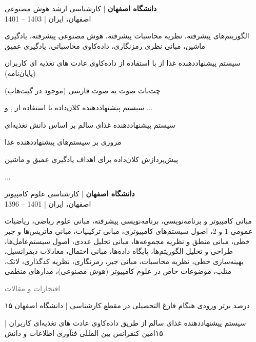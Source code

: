 \documentclass[a4paper]{deedy-persian} %
\begin{document}
\begin{minipage}[t]{0.62\textwidth}
\textbf{دانشگاه اصفهان} | کارشناسی ارشد هوش مصنوعی  \\
\vspace{\itemsep} 
1401 – 1403 | اصفهان، ایران
\vspace{\itemsep} 
\begin{tightitemize}
\item الگوریتم‌های پیشرفته، نظریه محاسبات پیشرفته، هوش مصنوعی پیشرفته، یادگیری ماشین، مبانی نظری رمزنگاری، داده‌کاوی محاسباتی، یادگیری عمیق
\item سیستم پیشنهاددهنده غذا از با استفاده از داده‌کاوی عادت های تغذیه ای کاربران (پایان‌نامه)
\item چت‌بات صوت به صوت فارسی (موجود در گیت‌هاب)
\item سیستم پیشنهاددهنده کلان‌داده با استفاده از ,  و ...
\item سیستم پیشنهاد‌دهنده غذای سالم بر اساس دانش تغذیه‌ای
\item مروری بر سیستم‌های پیشنهاددهنده غذا
\item پیش‌پردازش کلان‌داده برای اهداف یادگیری عمیق و ماشین
\item ...
\end{tightitemize}
\sectionspace %
\textbf{دانشگاه اصفهان} | کارشناسی علوم کامپیوتر  \\
\vspace{\itemsep} %
1396 – 1401 | اصفهان، ایران
\begin{tightitemize}
\item مبانی کامپیوتر و برنامه‌نویسی، برنامه‌نویسی پیشرفته، مبانی علوم ریاضی، ریاضیات عمومی 1 و 2، اصول سیستم‌های کامپیوتری، مبانی ترکیبیات، مبانی ماتریس‌ها و جبر خطی، مبانی منطق و نظریه مجموعه‌ها، مبانی تحلیل عددی، اصول سیستم‌عامل‌ها، طراحی و تحلیل الگوریتم‌ها، پایگاه داده‌ها، مبانی احتمال، معادلات دیفرانسیل، بهینه‌سازی خطی، نظریه محاسبات، مبانی جبر، رمزنگاری، نظریه کدگذاری، لاتک، متلب، موضوعات خاص در علوم کامپیوتر (هوش مصنوعی)، مدارهای منطقی
\end{tightitemize}
\sectionspace %
\vspace{\topsep}
\textcolor{gray}{\huge {افتخارات و مقالات}}
\vspace{\itemsep} %
\begin{tightitemize}
\item ۱۵ درصد برتر ورودی هنگام فارغ التحصیلی در مقطع کارشناسی | دانشگاه اصفهان
\item سیستم پیشنهاددهنده غذای سالم از طریق داده‌کاوی عادت های تغذیه‌ای کاربران | ۱۵‌امین کنفرانس بین المللی فنآوری اطلاعات و دانش 

\end{tightitemize}
\end{minipage}
\end{document}
